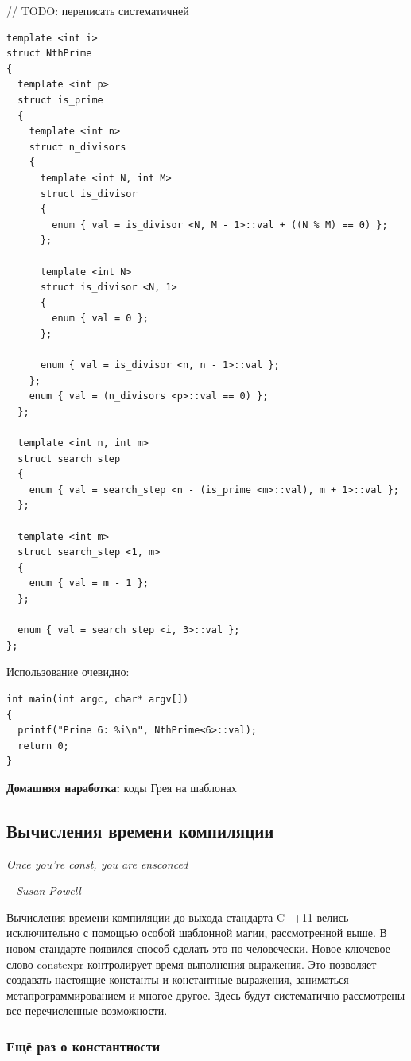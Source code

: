 \documentclass[a4paper,12pt,oneside]{article}
\begin{document}
// TODO: переписать систематичней

\begin{lstlisting}
template <int i>
struct NthPrime
{
  template <int p>
  struct is_prime
  {
    template <int n>
    struct n_divisors
    {
      template <int N, int M>
      struct is_divisor
      {
        enum { val = is_divisor <N, M - 1>::val + ((N % M) == 0) };
      };

      template <int N>
      struct is_divisor <N, 1>
      {
        enum { val = 0 };
      };

      enum { val = is_divisor <n, n - 1>::val };
    };
    enum { val = (n_divisors <p>::val == 0) };
  };

  template <int n, int m>
  struct search_step
  {
    enum { val = search_step <n - (is_prime <m>::val), m + 1>::val };
  };

  template <int m>
  struct search_step <1, m>
  {
    enum { val = m - 1 };
  };

  enum { val = search_step <i, 3>::val };
};
\end{lstlisting}

Использование очевидно:

\begin{lstlisting}
int main(int argc, char* argv[])
{
  printf("Prime 6: %i\n", NthPrime<6>::val);
  return 0;
}
\end{lstlisting}

\textbf{Домашняя наработка:} коды Грея на шаблонах



\pagebreak
\subsection{Вычисления времени компиляции}

\hfill\textit{Once you're const, you are ensconced}{\vspace{0.5em}}

\hfill\textit{-- Susan Powell}

Вычисления времени компиляции до выхода стандарта C++11 велись исключительно с помощью особой шаблонной магии, рассмотренной выше. В новом стандарте появился способ сделать это по человечески. Новое ключевое слово constexpr контролирует время выполнения выражения. Это позволяет создавать настоящие константы и константные выражения, заниматься метапрограммированием и многое другое. Здесь будут систематично рассмотрены все перечисленные возможности.

\subsubsection{Ещё раз о константности}\label{Constexpr}
\end{document}
